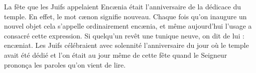  La fête que les Juifs appelaient Encænia
	était l’anniversaire de la dédicace du temple.
En effet, le mot cænon signifie nouveau.
Chaque fois qu’on inaugure un nouvel objet
	cela s’appelle ordinairement encænia,
	et même aujourd’hui l’usage a consacré cette expression.
Si quelqu’un revêt une tunique neuve, on dit de lui : encæniat.
Les Juifs célébraient avec solennité
	l’anniversaire du jour où le temple avait été dédié
	et l’on était au jour même de cette fête
	quand le Seigneur prononça les paroles qu’on vient de lire.
